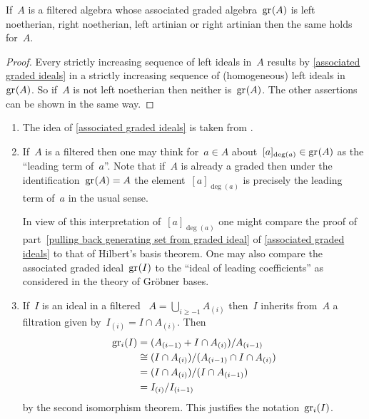 \begin{corollary}
  \label{universal enveloping reflects chain conditions}
  If~$A$ is a filtered algebra whose associated graded algebra~$\gr(A)$ is left noetherian, right noetherian, left artinian or right artinian then the same holds for~$A$.
\end{corollary}


\begin{proof}
  Every strictly increasing sequence of left ideals in~$A$ results by \cref{associated graded ideals} in a strictly increasing sequence of (homogeneous) left ideals in~$\gr(A)$.
  So if~$A$ is not left noetherian then neither is~$\gr(A)$.
  The other assertions can be shown in the same way.
\end{proof}


\begin{remark}
  \leavevmode
  \begin{enumerate}
    \item
      The idea of \cref{associated graded ideals} is taken from \cite[6.7,~6.9]{noncommutative_noetherian}.
    \item
      If~$A$ is a filtered {\algebra{$\kf$}} then one may think for~$a \in A$ about~$[a]_{\deg(a)} \in \gr(A)$ as the \enquote{leading term of~$a$}.
      Note that if~$A$ is already a graded {\algebra{$\kf$}} then under the identification~$\gr(A) = A$ the element~$[a]_{\deg(a)}$ is precisely the leading term of~$a$ in the usual sense.
      
      In view of this interpretation of~$[a]_{\deg(a)}$ one might compare the proof of part~\ref*{pulling back generating set from graded ideal} of \cref{associated graded ideals} to that of Hilbert’s basis theorem.
      One may also compare the associated graded ideal~$\gr(I)$ to the \enquote{ideal of leading coefficients} as considered in the theory of Gröbner bases.
    \item
      If~$I$ is an ideal in a filtered {\algebra{$\kf$}}~$A = \bigcup_{i \geq -1} A_{(i)}$ then~$I$ inherits from~$A$ a filtration given by~$I_{(i)} = I \cap A_{(i)}$.
      Then
      \begin{align*}
        \gr[i](I)
        &=
        (A_{(i-1)} + I \cap A_{(i)} ) / A_{(i-1)}
        \\
        &\cong
        (I \cap A_{(i)}) / ( A_{(i-1)} \cap I \cap A_{(i)} )
        \\
        &=
        (I \cap A_{(i)}) / (I \cap A_{(i-1)})
        \\
        &=
        I_{(i)} / I_{(i-1)}
      \end{align*}
      by the second isomorphism theorem.
      This justifies the notation~$\gr[i](I)$.
  \end{enumerate}
\end{remark}




